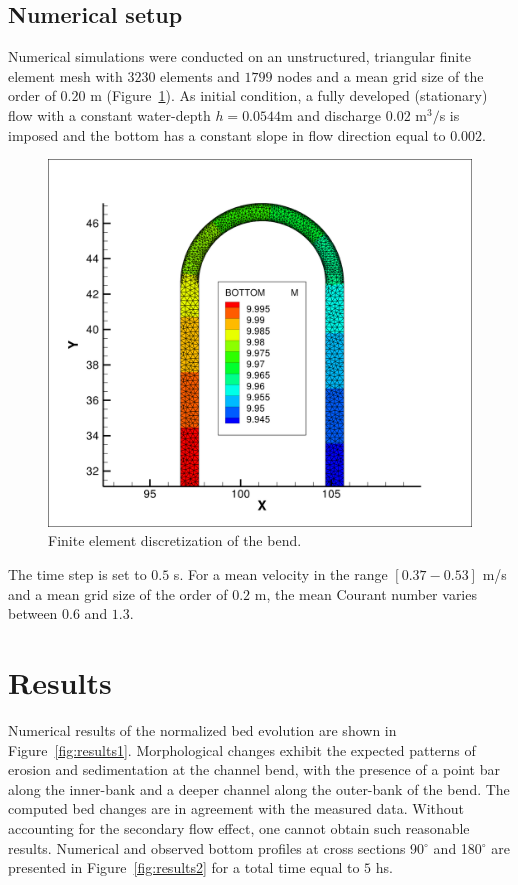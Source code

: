 %
%
\subsection{Numerical setup}
%
Numerical simulations were conducted on an unstructured, triangular finite element mesh with
$3230$ elements and $1799$ nodes and a mean grid size of the order of $0.20$ m (Figure~\ref{fig:mesh}).
As initial condition, a fully developed (stationary) flow with a constant water-depth $h = 0.0544$m and discharge $0.02$ m$^3/$s is imposed and the bottom has a constant slope in flow direction equal to $0.002$.

\begin{figure} [!h]
\centering
\includegraphics[scale=0.15]{../img/yen_grid_bottom.png}
 \caption{Finite element discretization of the bend.}\label{fig:mesh}
\end{figure}

The time step is set to $0.5$ s. For a mean velocity in the range $[0.37-0.53]$ m/s and
a mean grid size of the order of $0.2$ m, the mean Courant number varies between $0.6$ and $1.3$.

\section{Results}
%
Numerical results of the normalized bed evolution are shown in Figure~\ref{fig:results1}. Morphological changes exhibit the expected
patterns of erosion and sedimentation at the channel bend, with the presence of a point bar along the inner-bank and a deeper channel along the outer-bank of the bend.
The computed bed changes are in agreement with the measured data. Without accounting for the secondary flow effect, one cannot obtain such reasonable results.
Numerical and observed bottom profiles at cross sections 90$^{\circ}$ and 180$^{\circ}$ are presented in Figure~\ref{fig:results2} for a total time equal to $5$ hs.

